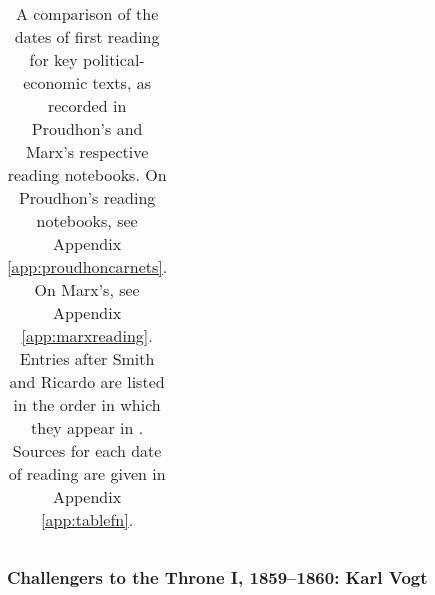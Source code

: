 \begin{table}[ht!]
\begin{threeparttable}
\begin{tabularx}{\linewidth}{Xcc}
        
        \bottomrule
    \end{tabularx}
    \end{threeparttable}
    \caption{A comparison of the dates of first reading for key political-economic texts, as recorded in Proudhon's and Marx's respective reading notebooks. On Proudhon's reading notebooks, see Appendix \ref{app:proudhoncarnets}. On Marx's, see Appendix \ref{app:marxreading}. Entries after Smith and Ricardo are listed in the order in which they appear in \cite{haubtmann_pierre_1982}. Sources for each date of reading are given in Appendix \ref{app:tablefn}.}
    \label{tab:reading}
\end{table}

\subsubsection{Challengers to the Throne I, 1859--1860: Karl Vogt\label{sec:vogt}}

